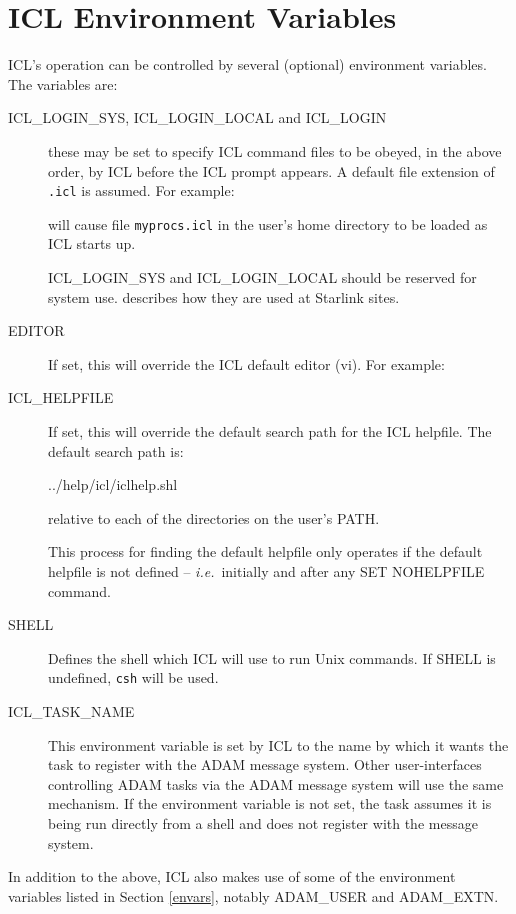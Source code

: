 \documentclass[twoside,11pt,nolof]{starlink}
\begin{document}
\section{\label{iclvars}ICL Environment Variables}
ICL's operation can be controlled by several (optional) environment
variables. The variables are:
\begin{description}
\item[ICL\_LOGIN\_SYS, ICL\_LOGIN\_LOCAL and ICL\_LOGIN]
these may be set to specify ICL command files to be obeyed,
in the above order, by ICL before the ICL prompt appears.
A default file extension of \texttt{.icl} is assumed. For example:
\begin{terminalv}
\end{terminalv}
will cause file \texttt{myprocs.icl} in the user's home directory to be loaded
as ICL starts up.

ICL\_LOGIN\_SYS and ICL\_LOGIN\_LOCAL should be reserved for system use.
describes how they are used at Starlink sites.
\item[EDITOR] If set, this will override the ICL default editor (vi).
For example:
\begin{terminalv}
\end{terminalv}
\item[ICL\_HELPFILE] If set, this will override the default search path for the
ICL helpfile. The default search path is:
\begin{terminalv}
../help/icl/iclhelp.shl
\end{terminalv}
relative to each of the directories on the user's PATH.

This process for finding the default helpfile only operates if the default
helpfile is not defined -- \textit{i.e.}\ initially and after any
SET NOHELPFILE command.
\item[SHELL] Defines the shell which ICL will use to run Unix commands.
If SHELL is undefined, \texttt{csh} will be used.
\item[ICL\_TASK\_NAME] This environment variable is set by ICL to the name
by which it wants the task to register with the ADAM message system. Other
user-interfaces controlling ADAM tasks via the ADAM message system will use the
same mechanism. If the environment variable is not set, the task assumes it
is being run directly from a shell and does not register with the message
system.
\end{description}
In addition to the above, ICL also makes use of some of the environment
variables listed in Section \ref{envars}, notably ADAM\_USER and ADAM\_EXTN.
\end{document}

